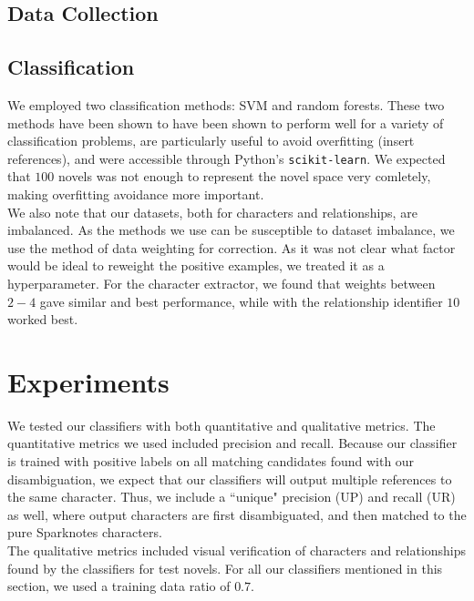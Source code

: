 \documentclass[12pt]{article}
\begin{document}
    \subsection{Data Collection}

    \subsection{Classification}

        We employed two classification methods: SVM and random forests. These
        two methods have been shown to have been shown to perform well for a variety of
        classification problems, are particularly useful to avoid overfitting (insert references),
        and were accessible through Python's \texttt{scikit-learn}.
        We expected that $100$ novels was not enough to represent the novel space very comletely,
        making overfitting avoidance more important. \\

        We also note that our datasets, both for characters and relationships, are imbalanced.
        As the methods we use can be susceptible to dataset imbalance, we use the method of
        data weighting for correction. As it was not clear what factor would be ideal to 
        reweight the positive examples, we treated it as a hyperparameter. For the character
        extractor, we found that weights between $2-4$ gave similar and best performance,
        while with the relationship identifier $10$ worked best.

\section{Experiments}

    We tested our classifiers with both quantitative and qualitative metrics. The quantitative
    metrics we used included precision and recall. Because our classifier is trained with positive 
    labels on all matching candidates found with our disambiguation, we expect that our classifiers 
    will output multiple references to the same character. Thus, we include a ``unique" precision (UP) 
    and recall (UR) as well, where output characters are first disambiguated, and then matched to
    the pure Sparknotes characters. \\
    
    The qualitative metrics included visual verification of characters and relationships found 
    by the classifiers for test novels. For all our classifiers mentioned in this section, we 
    used a training data ratio of $0.7$. 
\end{document}
